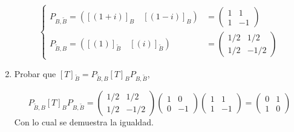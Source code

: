 \begin{enumerate}
\begin{mdframed}[style=s]
\[\begin{cases}
                    P_{B,\tilde{B}}=\left([(1+i)]_B\quad[(1-i)]_B\right)&=\begin{pmatrix}
                        1&1\\1&-1
                    \end{pmatrix}\\
                    P_{\tilde{B},B}=\left([(1)]_{\tilde{B}}\quad[(i)]_{\tilde{B}}\right)&=\begin{pmatrix}
                        1/2&1/2\\1/2&-1/2
                    \end{pmatrix}
                \end{cases}\]
            \end{mdframed}
        \item Probar que $[T]_{\tilde{B}}=P_{\tilde{B},B}[T]_BP_{B,\tilde{B}}$,
            \begin{mdframed}[style=s]
                \[P_{\tilde{B},B}[T]_BP_{B,\tilde{B}}=\begin{pmatrix}
                    1/2&1/2\\1/2&-1/2
                \end{pmatrix}\begin{pmatrix}
                    1&0\\0&-1
                \end{pmatrix}\begin{pmatrix}
                    1&1\\1&-1
                \end{pmatrix}=\begin{pmatrix}
                    0&1\\1&0
                \end{pmatrix}\]
                Con lo cual se demuestra la igualdad.
            \end{mdframed}
    \end{enumerate}